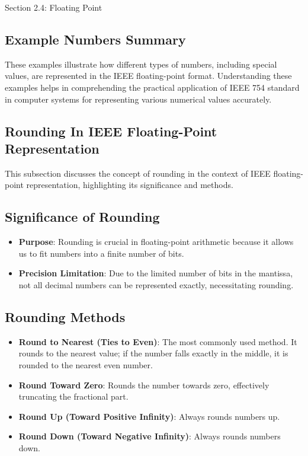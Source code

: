 \begin{notes}{Section 2.4: Floating Point}
    \subsection*{Example Numbers Summary}
    
    These examples illustrate how different types of numbers, including special values, are represented in the IEEE floating-point format. Understanding these examples helps in comprehending the practical 
    application of IEEE 754 standard in computer systems for representing various numerical values accurately.

    \subsection*{Rounding In IEEE Floating-Point Representation}

    This subsection discusses the concept of rounding in the context of IEEE floating-point representation, highlighting its significance and methods.
    
    \subsection*{Significance of Rounding}

    \begin{itemize}
        \item \textbf{Purpose}: Rounding is crucial in floating-point arithmetic because it allows us to fit numbers into a finite number of bits.
        \item \textbf{Precision Limitation}: Due to the limited number of bits in the mantissa, not all decimal numbers can be represented exactly, necessitating rounding.
    \end{itemize}

    \subsection*{Rounding Methods}

    \begin{itemize}
        \item \textbf{Round to Nearest (Ties to Even)}: The most commonly used method. It rounds to the nearest value; if the number falls exactly in the middle, it is rounded to the nearest even number.
        \item \textbf{Round Toward Zero}: Rounds the number towards zero, effectively truncating the fractional part.
        \item \textbf{Round Up (Toward Positive Infinity)}: Always rounds numbers up.
        \item \textbf{Round Down (Toward Negative Infinity)}: Always rounds numbers down.
    \end{itemize}


\end{notes}
